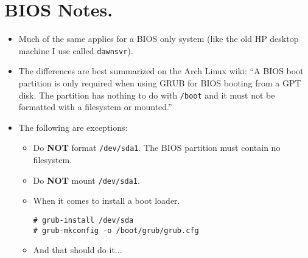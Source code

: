 \documentclass{article}
\begin{document}
\section{BIOS Notes.}
  \begin{itemize}
    \item Much of the same applies for a BIOS only system (like the old HP
      desktop machine I use called \verb|dawnsvr|).
    \item The differences are best summarized on the Arch Linux wiki: ``A BIOS
      boot partition is only required when using GRUB for BIOS booting from a
      GPT disk. The partition has nothing to do with \verb|/boot| and it must
      not be formatted with a filesystem or mounted.''
    \item The following are exceptions:
    \begin{itemize}
      \item Do \textbf{NOT} format \verb|/dev/sda1|. The BIOS partition must
        contain no filesystem.
      \item Do \textbf{NOT} mount \verb|/dev/sda1|.
      \item When it comes to install a boot loader.
\begin{verbatim}
# grub-install /dev/sda
# grub-mkconfig -o /boot/grub/grub.cfg
\end{verbatim}
      \item And that should do it...
    \end{itemize}
  \end{itemize}
\end{document}
